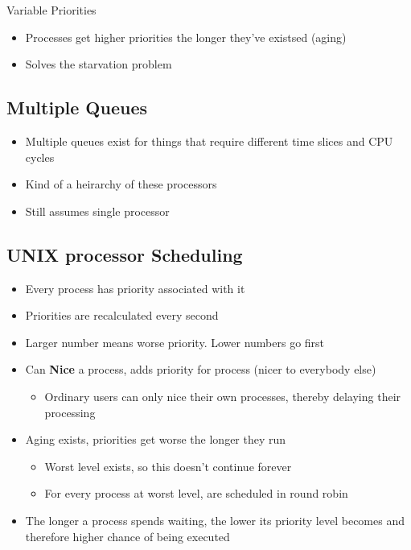 \documentclass{article}
\begin{document}
		Variable Priorities
		\begin{itemize}
			\item Processes get higher priorities the longer they've existsed (aging)
			\item Solves the starvation problem
		\end{itemize}

	\subsection{Multiple Queues}
		\begin{itemize}
			\item Multiple queues exist for things that require different time slices and CPU cycles
			\item Kind of a heirarchy of these processors
			\item Still assumes single processor
		\end{itemize}
		

	\subsection{UNIX processor Scheduling}
		\begin{itemize}
			\item Every process has priority associated with it
			\item Priorities are recalculated every second
			\item Larger number means worse priority. Lower numbers go first
			\item Can \textbf{Nice} a process, adds priority for process (nicer to everybody else)
			\begin{itemize}
				\item Ordinary users can only nice their own processes, thereby delaying their processing
			\end{itemize}
			\item Aging exists, priorities get worse the longer they run
			\begin{itemize}
				\item Worst level exists, so this doesn't continue forever
				\item For every process at worst level, are scheduled in round robin
			\end{itemize}
			\item The longer a process spends waiting, the lower its priority level becomes and therefore higher chance of being executed
		\end{itemize}
		
\end{document}
